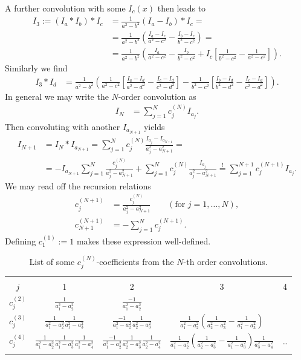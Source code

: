 \documentclass[english, parskip=full]{scrartcl}
\newcommand{\kla}{}
\newcommand{\klam}{}
\newcommand{\tecxt}{}
\begin{document}
A further convolution with some $I_c(x)$ then leads to
\begin{align}
I_3 := \left( I_a \ast I_b \right) \ast I_c &= \frac{1}{a^2 - b^2} \kla\left( I_a - I_b \right) \ast I_c = \\
&= \frac{1}{a^2 - b^2} \kla\left( \frac{I_a - I_c}{a^2 - c^2} - \frac{I_b - I_c}{b^2 - c^2} \right) = \\
&= \frac{1}{a^2 - b^2} \kla\left( \frac{I_a}{a^2 - c^2} - \frac{I_b}{b^2 - c^2} + I_c \klam\left[ \frac{1}{b^2 - c^2} - \frac{1}{a^2 - c^2} \right] \right).
\end{align}
Similarly we find
\begin{align}
I_3 \ast I_d &= \frac{1}{a^2 - b^2} \kla\left( \frac{1}{a^2 - c^2} \klam\left[ \frac{I_a - I_d}{a^2 - d^2} - \frac{I_c - I_d}{c^2 - d^2} \right] - \frac{1}{b^2 - c^2} \klam\left[ \frac{I_b - I_d}{b^2 - d^2} - \frac{I_c - I_d}{c^2 - d^2} \right] \right).
\end{align}
In general we may write the $N$-order convolution as
\begin{align}
I_N &= \sum_{j=1}^N c^{(N)}_j I_{a_j}.
\end{align}
Then convoluting with another $I_{a_{N+1}}$ yields
\begin{align}
I_{N+1} &= I_N \ast I_{a_{N+1}} = \sum_{j=1}^N c^{(N)}_j \frac{I_{a_j} - I_{a_{N+1}}}{a_j^2 - a_{N+1}^2} = \\
&= -I_{a_{N+1}} \sum_{j=1}^N \frac{c^{(N)}_j}{a_j^2 - a_{N+1}^2} + \sum_{j=1}^N c^{(N)}_j \frac{I_{a_j}}{a_j^2 - a_{N+1}^2} \overset{!}{=} \sum_{j=1}^{N+1} c^{(N+1)}_j I_{a_j}.
\end{align}
We may read off the recursion relations
\begin{align}
c_j^{(N+1)} &= \frac{c_j^{(N)}}{a_j^2 - a_{N+1}^2} \qquad (\tecxt\text{for } j=1,\dots,N),\\
c_{N+1}^{(N+1)} &= - \sum_{j=1}^N c_j^{(N+1)}.
\end{align}
Defining $c^{(1)}_1 := 1$ makes these expression well-defined.
\begin{table}[!ht]
\centering
\begin{tabular}{*5c}
\toprule\\
$j$ & 1 & 2 & 3 & 4 \\ \midrule 
$c_j^{(2)}$ & $\frac{1}{a_1^2 - a_2^2}$ & $\frac{-1}{a_1^2 - a_2^2}$ & & \\
$c_j^{(3)}$ & $\frac{1}{a_1^2 - a_2^2} \frac{1}{a_1^2 - a_3^2}$ & $\frac{-1}{a_1^2 - a_2^2} \frac{1}{a_2^2 - a_3^2}$ & $\frac{1}{a_1^2 - a_2^2} \kla\left( \frac{1}{a_2^2 - a_3^2} - \frac{1}{a_1^2 - a_3^2} \right)$ & \\
$c_j^{(4)}$ & $\frac{1}{a_1^2 - a_2^2} \frac{1}{a_1^2 - a_3^2} \frac{1}{a_1^2 - a_4^2}$ & $\frac{-1}{a_1^2 - a_2^2} \frac{1}{a_2^2 - a_3^2} \frac{1}{a_2^2 - a_4^2}$ & $\frac{1}{a_1^2 - a_2^2} \kla\left( \frac{1}{a_2^2 - a_3^2} - \frac{1}{a_1^2 - a_3^2} \right) \frac{1}{a_3^2 - a_4^2}$ & \dots \\
\bottomrule\\
\end{tabular}
\caption{List of some $c_j^{(N)}$-coefficients from the $N$-th order convolutions.}
\label{table:convolution-cjN-coefficients}
\end{table}
\end{document}
